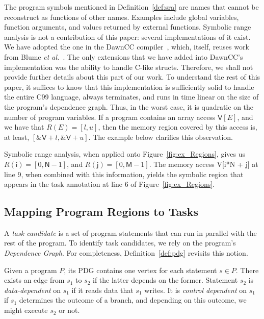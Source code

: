 \documentclass[sigplan,10pt,review,anonymous]{acmart}
\newcommand\dawn{\mbox{\textsf{DawnCC}}}
\begin{document}
The program symbols mentioned in Definition~\ref{def:sra} are names that cannot 
be reconstruct as functions of other names.
Examples include global variables, function arguments, and values returned by
external functions.
Symbolic range analysis is not a contribution of this paper: several
implementations of it exist.
We have adopted the one in the \dawn{} compiler~\cite{Mendonca17}, which, itself,
reuses work from Blume {\em et al.}~\cite{Blume94}.
The only extensions that we have added into \dawn's implementation was
the ability to handle C-like \textsf{structs}.
Therefore, we shall not provide further details about this part of our work.
To understand the rest of this paper, it suffices to know that this implementation
is sufficiently solid to handle the entire C99 language, always terminates, and
runs in time linear on the size of the program's dependence graph.
Thus, in the worst case, it is quadratic on the number of program variables.
If a program contains an array access $\textsf{V}[E]$, and we have that
$R(E) = [l, u]$, then the memory region covered by this access is, at least,
$[\mathtt{\&}\textsf{V} + l, \mathtt{\&}\textsf{V} + u]$.
The example below clarifies this observation.

\begin{example}
\label{ex:sra}
Symbolic range analysis, when applied onto Figure~\ref{fig:ex_Regions}, gives us
$R(\mathsf{i}) = [0, \mathsf{N} - 1]$, and $R(\mathsf{j}) = [0, \mathsf{M} - 1]$.
The memory access \textsf{V[i*N + j]} at line 9, when combined with this
information, yields the symbolic region that appears in the task annotation at
line 6 of Figure~\ref{fig:ex_Regions}.
\end{example}

\subsection{Mapping Program Regions to Tasks}
\label{sub:identification}

A {\em task candidate} is a set of program statements that can run in parallel
with the rest of the program.
To identify task candidates, we rely on the program's
{\em Dependence Graph}.
For completeness, Definition~\ref{def:pdg} revisits this notion.

\begin{definition}
\label{def:pdg}
Given a program $P$, its PDG contains one vertex for each statement $s \in P$.
There exists an edge from $s_1$ to $s_2$ if the latter depends on the former.
Statement $s_2$ is {\em data-dependent} on $s_1$ if it reads data that $s_1$
writes.
It is {\em control dependent} on $s_1$ if $s_1$ determines the outcome of a
branch, and depending on this outcome, we might execute $s_2$ or not.
\end{definition}
\end{document}
